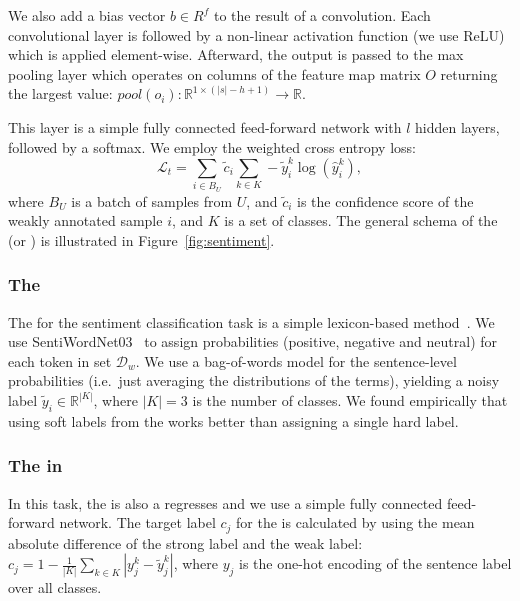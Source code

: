 We also add a bias vector $b \in R^f$ to the result of a convolution.
Each convolutional layer is followed by a non-linear activation function (we use ReLU\cite{Nair:2010}) which is applied element-wise. Afterward, the output is passed to the max pooling layer which operates on columns of the feature map matrix $O$ returning the largest value: $pool(o_i) : \mathbb{R}^{1\times(|s|-h+1)} \rightarrow \mathbb{R}$.

This layer is a simple fully connected feed-forward network with $l$ hidden layers, followed by a softmax.  We employ the weighted cross entropy loss:
\begin{equation}
\mathcal{L}_t = \sum_{i\in B_U} \tilde{c}_i \sum_{k \in K} - \tilde{y}_i^k \log (\hat{y}_i^k),
\end{equation}
where $B_U$ is a batch of samples from $U$, and $\tilde{c}_i$ is the confidence score of the weakly annotated sample $i$, and $K$ is a set of classes. 
The general schema of the \tnet (or \std) is illustrated in Figure~\ref{fig:sentiment}.

\subsubsection{The \wa}
\label{sentiment-WA}
The \wa for the sentiment classification task is a simple lexicon-based method~\citep{Hamdan:2013,Kiritchenko:2014}.
We use SentiWordNet03~\citep{Gaccianella:2010} to assign probabilities (positive, negative and neutral) for each token in set $\mathcal{D}_w$. We use a bag-of-words model for the sentence-level probabilities (i.e.\ just averaging the distributions of the terms), yielding a noisy label $\tilde{y}_i \in \mathbb{R}^{|K|}$, where $|K|=3$ is the number of classes.  We found empirically that using soft labels from the \wa works better than assigning a single hard label.


\subsubsection{The \cnet in \cws}
In this task, the \cnet is also a regresses and we use a simple fully connected feed-forward network. The target label $c_j$ for the \cnet is calculated by using the mean absolute difference of the strong label and the weak label: $c_j= 1-\frac{1}{|K|}\sum_{k\in K}|y_j^k - \tilde{y}_j^k|$, where $y_j$ is the one-hot encoding of the sentence label over all classes.


